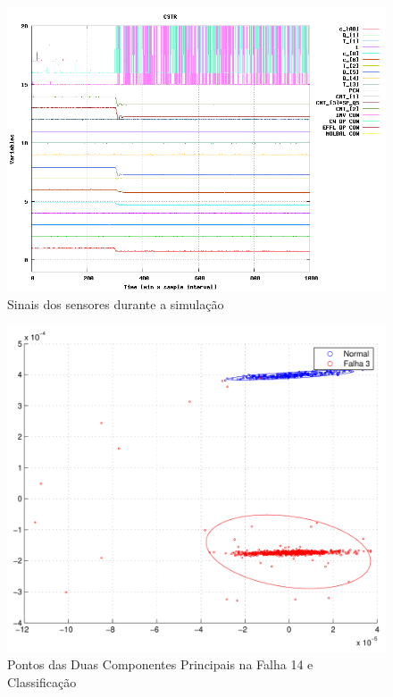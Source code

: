 \documentclass[journal]{IEEEtran}
\begin{document}
\begin{figure}[H]
	\centering
  	\includegraphics[scale=0.5]{figs/fault14/sinal_falha_14.png}
  	\caption{Sinais dos sensores durante a simulação}
	\label{fig:f14:s}
\end{figure}

\begin{figure}[H]
	\centering
  \includegraphics[scale=0.6]{figs/fault14/pontos2D.pdf}
  \caption{Pontos das Duas Componentes Principais na Falha 14 e Classificação}
	\label{fig:f14:2d}
\end{figure}
\end{document}
